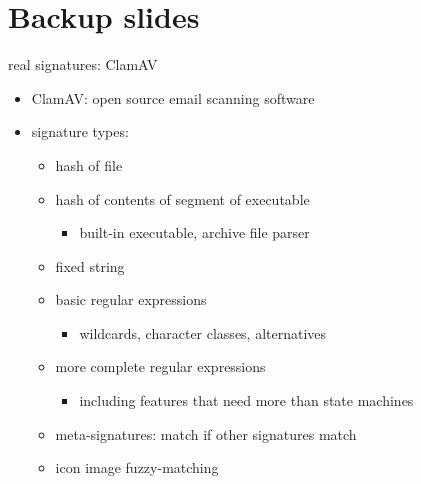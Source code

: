 \section{Backup slides}
\begin{frame}{real signatures: ClamAV}
\begin{itemize}
\item ClamAV: open source email scanning software
\item signature types:
    \begin{itemize}
    \item hash of file
    \item hash of contents of segment of executable
        \begin{itemize}
        \item built-in executable, archive file parser
        \end{itemize}
    \item fixed string
    \item basic regular expressions
        \begin{itemize}
        \item wildcards, character classes, alternatives
        \end{itemize}
    \item more complete regular expressions
        \begin{itemize}
        \item including features that need more than state machines
        \end{itemize}
    \item meta-signatures: match if other signatures match
    \item icon image fuzzy-matching
    \end{itemize}
\end{itemize}
\end{frame}
